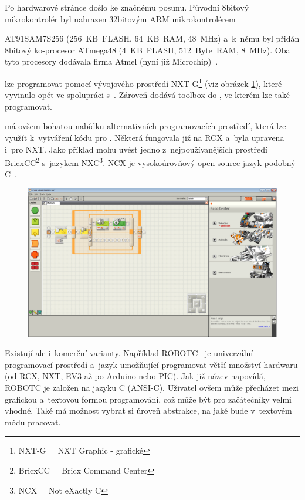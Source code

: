 Po hardwarové stránce došlo ke značnému posunu. Původní 8bitový mikrokontrolér byl nahrazen 32bitovým ARM mikrokontrolérem %

AT91SAM7S256 (256~KB~FLASH, 64~KB~RAM, 48~MHz) a~k~němu byl přidán 8bitový ko-procesor ATmega48 (4~KB~FLASH, 512~Byte~RAM, 8~MHz). 
Oba tyto procesory dodávala firma Atmel (nyní již Microchip)~\cite{legoMindstormsNXT_hardware}.


\brick{ }lze programovat pomocí vývojového prostředí NXT-G\footnote{NXT-G = NXT Graphic - grafické} (viz obrázek \ref{fig:lego-mindstorms-nxt-g}), které \lego{ }vyvinulo opět ve spolupráci s~\NI{~}\cite{legoMindstormsNXT_NXT-G}. 
Zároveň \NI{ }dodává toolbox do \labview{}, ve kterém lze \brick{ }také programovat. 

\legoNXT{ }má ovšem bohatou nabídku alternativních programovacích prostředí, která lze využít k~vytváření kódu pro \brick. 
Některá fungovala již na RCX a~byla upravena i~pro NXT. 
Jako příklad mohu uvést jedno z~nejpoužívanějších prostředí BricxCC\footnote{BricxCC = Bricx Command Center} s~jazykem NXC\footnote{NCX = Not eXactly C}. 
NCX je vysokoúrovňový open-source jazyk podobný C~\cite{legoWikipediaNXT_NXC}.

\begin{figure}[h]
	\centering
	\includegraphics[width=\textwidth]{images/lego-mindstorms-nxt-g.png}
	\caption[]{\protect\footnotemark}
	\label{fig:lego-mindstorms-nxt-g}
\end{figure}

Existují ale i~komerční varianty. 
Například ROBOTC~\cite{legoProgramingPlatform_ROBOTC} je univerzální programovací prostředí a~jazyk umožňující programovat větší množství hardwaru (od \legoM{ }RCX, NXT, EV3 až po Arduino nebo PIC). 
Jak již název napovídá, ROBOTC je založen na jazyku C (ANSI-C).
Uživatel ovšem může přecházet mezi grafickou a~textovou formou programování, což může být pro začátečníky velmi vhodné.
Také má možnost vybrat si úroveň abstrakce, na jaké bude v~textovém módu pracovat.  

